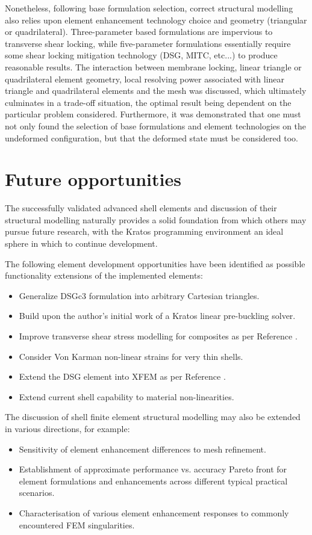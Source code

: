 Nonetheless, following base formulation selection, correct structural modelling also relies upon element enhancement technology choice and geometry (triangular or quadrilateral). Three-parameter  based formulations are impervious to transverse shear locking, while five-parameter formulations essentially require some shear locking mitigation technology (DSG, MITC, etc...) to produce reasonable results. The interaction between membrane locking, linear triangle or quadrilateral element geometry, local resolving power associated with linear triangle and quadrilateral elements and the mesh was discussed, which ultimately culminates in a trade-off situation, the optimal result being dependent on the particular problem considered. Furthermore, it was demonstrated that one must not only found the selection of base formulations and element technologies on the undeformed configuration, but that the deformed state must be considered too. 

\section{Future opportunities}

The successfully validated advanced shell elements and discussion of their structural modelling naturally provides a solid foundation from which others may pursue future research, with the Kratos programming environment an ideal sphere in which to continue development. 

The following element development opportunities have been identified as possible functionality extensions of the implemented elements:
\begin{itemize}
	\item Generalize DSGc3 formulation into arbitrary Cartesian triangles.
	\item Build upon the author's initial work of a Kratos linear pre-buckling solver.
	\item Improve transverse shear stress modelling for composites as per Reference \cite{rolfes1997improved}.
	\item Consider Von Karman non-linear strains for very thin shells.
	\item Extend the DSG element into XFEM as per Reference \cite{DSG_XFEM_2015}.
	\item Extend current shell capability to material non-linearities.
\end{itemize}

The discussion of shell finite element structural modelling may also be extended in various directions, for example:
\begin{itemize}
	\item Sensitivity of element enhancement differences to mesh refinement.
	\item Establishment of approximate performance vs. accuracy Pareto front for element formulations and enhancements across different typical practical scenarios.
	\item Characterisation of various element enhancement responses to commonly encountered FEM singularities.
\end{itemize}

